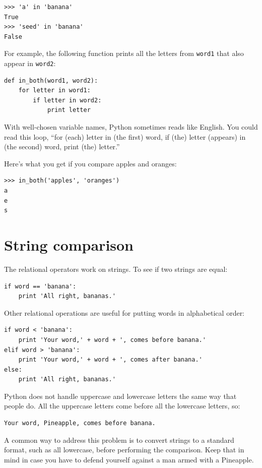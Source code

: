 \documentclass[10pt]{book}
\begin{document}
\begin{CJK}{UTF8}{gbsn}
\begin{verbatim}
>>> 'a' in 'banana'
True
>>> 'seed' in 'banana'
False
\end{verbatim}
%
For example, the following function prints all the
letters from {\tt word1} that also appear in {\tt word2}:

\begin{verbatim}
def in_both(word1, word2):
    for letter in word1:
        if letter in word2:
            print letter
\end{verbatim}
%
With well-chosen variable names,
Python sometimes reads like English.  You could read
this loop, ``for (each) letter in (the first) word, if (the) letter 
(appears) in (the second) word, print (the) letter.''

Here's what you get if you compare apples and oranges:

\begin{verbatim}
>>> in_both('apples', 'oranges')
a
e
s
\end{verbatim}
%

\section{String comparison}

The relational operators work on strings.  To see if two strings are equal:

\begin{verbatim}
if word == 'banana':
    print 'All right, bananas.'
\end{verbatim}
%
Other relational operations are useful for putting words in alphabetical
order:

\begin{verbatim}
if word < 'banana':
    print 'Your word,' + word + ', comes before banana.'
elif word > 'banana':
    print 'Your word,' + word + ', comes after banana.'
else:
    print 'All right, bananas.'
\end{verbatim}
%
Python does not handle uppercase and lowercase letters the same way
that people do.  All the uppercase letters come before all the
lowercase letters, so:

\begin{verbatim}
Your word, Pineapple, comes before banana.
\end{verbatim}
%
A common way to address this problem is to convert strings to a
standard format, such as all lowercase, before performing the
comparison.  Keep that in mind in case you have to defend yourself
against a man armed with a Pineapple.



\end{CJK}
\end{document}
